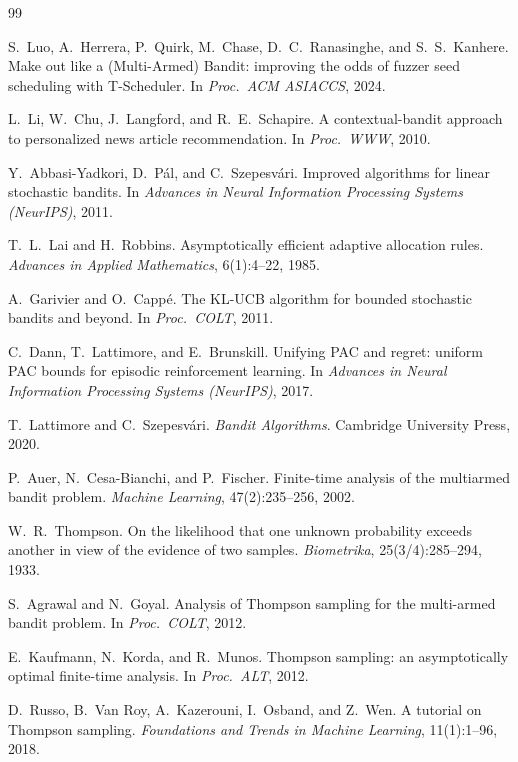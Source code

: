 \documentclass[UTF8,a4paper,11pt,zihao=5]{ctexart}
\begin{document}
\begin{thebibliography}{99}

S.~Luo, A.~Herrera, P.~Quirk, M.~Chase, D.~C.~Ranasinghe, and S.~S.~Kanhere.
Make out like a (Multi-Armed) Bandit: improving the odds of fuzzer seed scheduling with T-Scheduler.
In {\em Proc.\ ACM ASIACCS}, 2024.

L.~Li, W.~Chu, J.~Langford, and R.~E.~Schapire.
A contextual-bandit approach to personalized news article recommendation.
In {\em Proc.\ WWW}, 2010.

Y.~Abbasi-Yadkori, D.~P\'al, and C.~Szepesv\'ari.
Improved algorithms for linear stochastic bandits.
In {\em Advances in Neural Information Processing Systems (NeurIPS)}, 2011.

T.~L.~Lai and H.~Robbins.
Asymptotically efficient adaptive allocation rules.
{\em Advances in Applied Mathematics}, 6(1):4--22, 1985.

A.~Garivier and O.~Capp\'e.
The KL-UCB algorithm for bounded stochastic bandits and beyond.
In {\em Proc.\ COLT}, 2011.

C.~Dann, T.~Lattimore, and E.~Brunskill.
Unifying PAC and regret: uniform PAC bounds for episodic reinforcement learning.
In {\em Advances in Neural Information Processing Systems (NeurIPS)}, 2017.

T.~Lattimore and C.~Szepesv\'ari.
{\em Bandit Algorithms}.
Cambridge University Press, 2020.

P.~Auer, N.~Cesa-Bianchi, and P.~Fischer.
Finite-time analysis of the multiarmed bandit problem.
{\em Machine Learning}, 47(2):235--256, 2002.

W.~R.~Thompson.
On the likelihood that one unknown probability exceeds another in view of the evidence of two samples.
{\em Biometrika}, 25(3/4):285--294, 1933.

S.~Agrawal and N.~Goyal.
Analysis of Thompson sampling for the multi-armed bandit problem.
In {\em Proc.\ COLT}, 2012.

E.~Kaufmann, N.~Korda, and R.~Munos.
Thompson sampling: an asymptotically optimal finite-time analysis.
In {\em Proc.\ ALT}, 2012.

D.~Russo, B.~Van Roy, A.~Kazerouni, I.~Osband, and Z.~Wen.
A tutorial on Thompson sampling.
{\em Foundations and Trends in Machine Learning}, 11(1):1--96, 2018.


\end{thebibliography}
\end{document}
